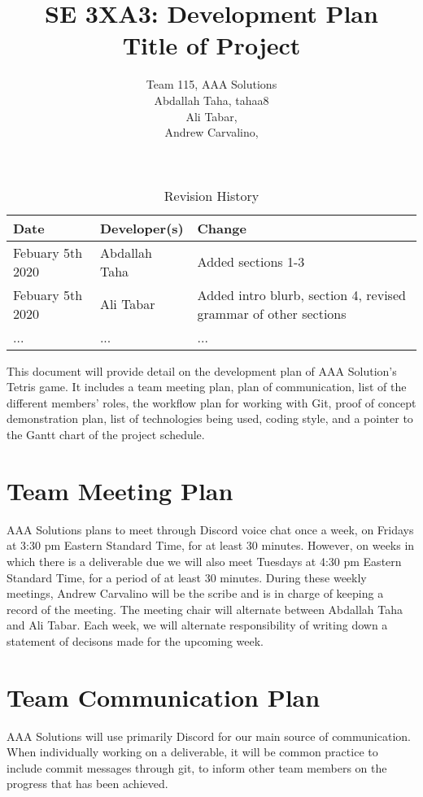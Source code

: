\documentclass{article}
\title{SE 3XA3: Development Plan\\Title of Project}
\author{Team 115, AAA Solutions
		\\ Abdallah Taha, tahaa8
		\\ Ali Tabar, 
		\\ Andrew Carvalino,
}
\date{}
\begin{document}
\begin{table}[hp]
\caption{Revision History} \label{TblRevisionHistory}
\begin{tabularx}{\textwidth}{llX}
\toprule
\textbf{Date} & \textbf{Developer(s)} & \textbf{Change} \\
\midrule
Febuary 5th 2020 & Abdallah Taha & Added sections 1-3 \\
Febuary 5th 2020 & Ali Tabar & Added intro blurb, section 4, revised grammar of other sections \\
... & ... & ...\\
\bottomrule
\end{tabularx}
\end{table}

\newpage

\maketitle

This document will provide detail on the development plan of AAA Solution's Tetris game. It includes a team meeting plan, plan of communication, list of the different members' roles, the workflow plan for working with Git, proof of concept demonstration plan, list of technologies being used, coding style, and a pointer to the Gantt chart of the project schedule.

\section{Team Meeting Plan}
AAA Solutions plans to meet through Discord voice chat once a week, on Fridays at 3:30 pm Eastern Standard Time, for at least 30 minutes. However, on weeks in which there is a deliverable due we will also meet Tuesdays at 4:30 pm Eastern Standard Time, for a period of at least 30 minutes. During these weekly meetings, Andrew Carvalino will be the scribe and is in charge of keeping a record of the meeting. The meeting chair will alternate between Abdallah Taha and Ali Tabar. Each week, we will alternate responsibility of writing down a statement of decisons made for the upcoming week. 

\section{Team Communication Plan}
AAA Solutions will use primarily Discord for our main source of communication. When individually working on a deliverable, it will be common practice to include commit messages through git, to inform other team members on the progress that has been achieved. 
\end{document}
